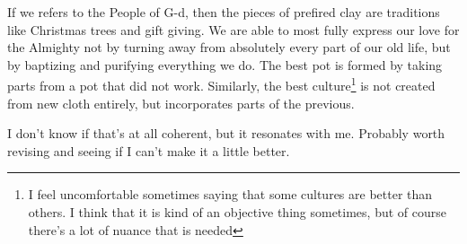 \documentclass[12pt]{article}[titlepage]
\newcommand{\1}{\={a}}
\newcommand{\2}{\={e}}
\newcommand{\3}{\={\i}}
\newcommand{\4}{\=o}
\newcommand{\5}{\=u}
\newcommand{\6}{\={A}}
\renewcommand{\,}{\textsuperscript{,}}
\begin{document}
If we refers to the People of G-d, then the pieces of prefired clay are traditions like Christmas trees and gift giving.
We are able to most fully express our love for the Almighty not by turning away from absolutely every part of our old life, but by baptizing and purifying everything we do.
The best pot is formed by taking parts from a pot that did not work.
Similarly, the best culture\footnote{I feel uncomfortable sometimes saying that some cultures are better than others. I think that it is kind of an objective thing sometimes, but of course there's a lot of nuance that is needed} is not created from new cloth entirely, but incorporates parts of the previous.

I don't know if that's at all coherent, but it resonates with me.
Probably worth revising and seeing if I can't make it a little better.
\end{document}
